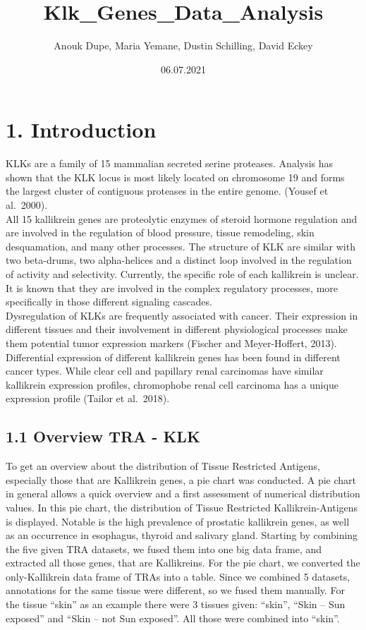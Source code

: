 \documentclass[
]{article}
\title{Klk\_Genes\_Data\_Analysis}
\author{Anouk Dupe, Maria Yemane, Dustin Schilling, David Eckey}
\date{06.07.2021}
\begin{document}
\maketitle

\pagebreak
\tableofcontents
\pagebreak
{}

\hypertarget{introduction}{%
\section{1. Introduction}\label{introduction}}

KLKs are a family of 15 mammalian secreted serine proteases. Analysis
has shown that the KLK locus is most likely located on chromosome 19 and
forms the largest cluster of contiguous proteases in the entire genome.
(Yousef et al.~2000).\\
All 15 kallikrein genes are proteolytic enzymes of steroid hormone
regulation and are involved in the regulation of blood pressure, tissue
remodeling, skin desquamation, and many other processes. The structure
of KLK are similar with two beta-drums, two alpha-helices and a distinct
loop involved in the regulation of activity and selectivity. Currently,
the specific role of each kallikrein is unclear. It is known that they
are involved in the complex regulatory processes, more specifically in
those different signaling cascades.\\
Dysregulation of KLKs are frequently associated with cancer. Their
expression in different tissues and their involvement in different
physiological processes make them potential tumor expression markers
(Fischer and Meyer-Hoffert, 2013).\\
Differential expression of different kallikrein genes has been found in
different cancer types. While clear cell and papillary renal carcinomas
have similar kallikrein expression profiles, chromophobe renal cell
carcinoma has a unique expression profile (Tailor et al.~2018).

\hypertarget{overview-tra---klk}{%
\subsection{1.1 Overview TRA - KLK}\label{overview-tra---klk}}

To get an overview about the distribution of Tissue Restricted Antigens,
especially those that are Kallikrein genes, a pie chart was conducted. A
pie chart in general allows a quick overview and a first assessment of
numerical distribution values. In this pie chart, the distribution of
Tissue Restricted Kallikrein-Antigens is displayed. Notable is the high
prevalence of prostatic kallikrein genes, as well as an occurrence in
esophagus, thyroid and salivary gland. Starting by combining the five
given TRA datasets, we fused them into one big data frame, and extracted
all those genes, that are Kallikreins. For the pie chart, we converted
the only-Kallikrein data frame of TRAs into a table. Since we combined 5
datasets, annotations for the same tissue were different, so we fused
them manually. For the tissue ``skin'' as an example there were 3
tissues given: ``skin'', ``Skin -- Sun exposed'' and ``Skin -- not Sun
exposed''. All those were combined into ``skin''.
\end{document}
